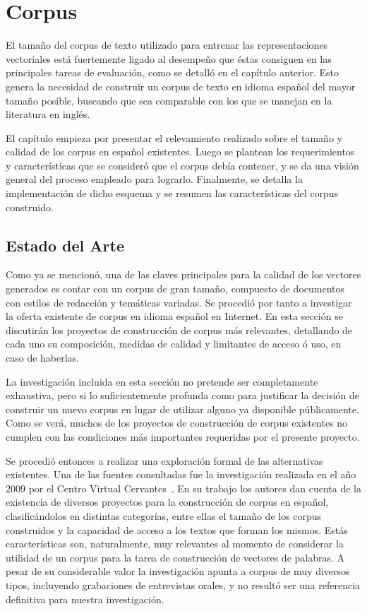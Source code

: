 \chapter{Corpus}

El tamaño del corpus de texto utilizado para entrenar las representaciones vectoriales está
fuertemente ligado al desempeño que éstas consiguen en las principales tareas de evaluación,
como se detalló en el capítulo anterior. Esto genera la necesidad de construir un corpus de texto en
idioma español del mayor tamaño posible, buscando que sea comparable con los que se manejan en la
literatura en inglés.

El capítulo empieza por presentar el relevamiento realizado sobre el tamaño y calidad de los corpus
en español existentes. Luego se plantean los requerimientos y características que se consideró que
el corpus debía contener, y se da una visión general del proceso empleado para lograrlo. Finalmente,
se detalla la implementación de dicho esquema y se resumen las características del corpus
construido.

\section{Estado del Arte}

Como ya se mencionó, una de las claves principales para la calidad de los vectores generados es contar
con un corpus de gran tamaño, compuesto de documentos con estilos de redacción y temáticas variadas.
Se procedió por tanto a investigar la oferta existente de corpus en idioma español en Internet. En esta
sección se discutirán los proyectos de construcción de corpus más relevantes, detallando de cada uno su
composición, medidas de calidad y limitantes de acceso ó uso, en caso de haberlas.

La investigación incluida en esta sección no pretende ser completamente exhaustiva, pero si lo
suficientemente profunda como para justificar la decisión de construir un nuevo corpus en lugar de
utilizar alguno ya disponible públicamente. Como se verá, muchos de los proyectos de construcción de
corpus existentes no cumplen con las condiciones más importantes requeridas por el presente proyecto.

Se procedió entonces a realizar una exploración formal de las alternativas existentes. Una de las
fuentes consultadas fue la investigación realizada en el año 2009 por el Centro Virtual
Cervantes~\cite{CorpusCervantes}. En su trabajo los autores dan cuenta de la existencia de diversos
proyectos para la construcción de corpus en español, clasificándolos en distintas categorías, entre ellas
el tamaño de los corpus construidos y la capacidad de acceso a los textos que forman los mismos. Estás
características son, naturalmente, muy relevantes al momento de considerar la utilidad de un corpus para la
tarea de construcción de vectores de palabras. A pesar de su considerable valor la investigación apunta a
corpus de muy diversos tipos, incluyendo grabaciones de entrevistas orales, y no resultó ser una referencia
definitiva para nuestra investigación.

